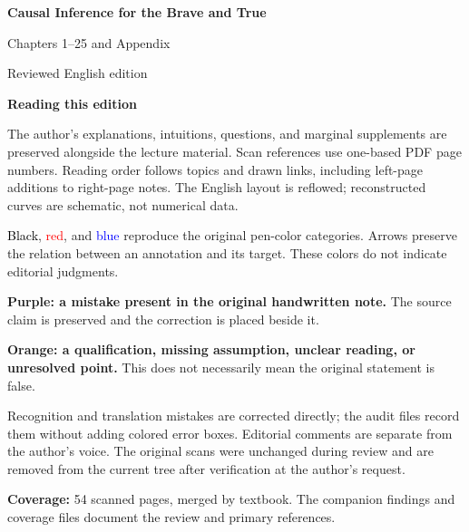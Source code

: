 \documentclass[11pt,a4paper]{article}
\newcommand{\inkblue}[1]{\textcolor{blue}{#1}}
\newcommand{\inkred}[1]{\textcolor{red}{#1}}
\begin{document}
\begin{titlepage}\thispagestyle{empty}
\vspace*{14mm}{\small\sffamily MING'S PERSONAL STUDY NOTES\par}\vspace{10mm}
{\Huge\sffamily\bfseries Causal Inference for the Brave and True\par}\vspace{8mm}
{\LARGE\sffamily Chapters 1--25 and Appendix\par}\vspace{10mm}
{\large Reviewed English edition\par}\vfill
\textbf{Reading this edition}\par
The author's explanations, intuitions, questions, and marginal supplements are preserved alongside the lecture material. Scan references use one-based PDF page numbers. Reading order follows topics and drawn links, including left-page additions to right-page notes. The English layout is reflowed; reconstructed curves are schematic, not numerical data.\par
\textcolor{black}{Black}, \inkred{red}, and \inkblue{blue} reproduce the original pen-color categories. Arrows preserve the relation between an annotation and its target. These colors do not indicate editorial judgments.\par
\textcolor{ReviewPurple}{\textbf{Purple: a mistake present in the original handwritten note.}} The source claim is preserved and the correction is placed beside it.\par
\textcolor{ReviewOrange}{\textbf{Orange: a qualification, missing assumption, unclear reading, or unresolved point.}} This does not necessarily mean the original statement is false.\par
Recognition and translation mistakes are corrected directly; the audit files record them without adding colored error boxes. Editorial comments are separate from the author's voice. The original scans were unchanged during review and are removed from the current tree after verification at the author's request.\par
\textbf{Coverage:} 54 scanned pages, merged by textbook. The companion findings and coverage files document the review and primary references.\par
\vspace{6mm}{\small Prepared 31 October 2026\par}
\end{titlepage}\tableofcontents\clearpage
\end{document}
